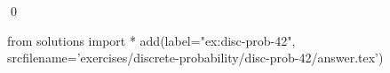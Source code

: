 
\begin{ex} 
  \label{ex:disc-prob-42}
  
  \qed
\end{ex} 
\begin{python0}
from solutions import *
add(label="ex:disc-prob-42",
    srcfilename='exercises/discrete-probability/disc-prob-42/answer.tex') 
\end{python0}
